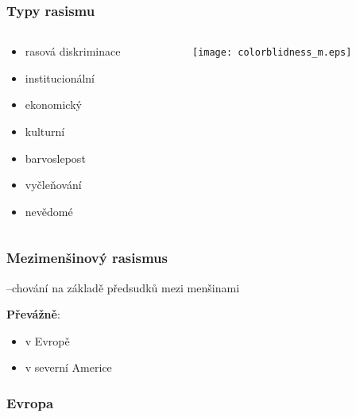 \documentclass{beamer}
\begin{document}
\begin{frame}
\transwipe
{}
\frametitle{Typy rasismu}
\begin{columns}[onlytextwidth]
\begin{column}{0.4\textwidth}
\begin{itemize}
\item rasová diskriminace
\item institucionální
\item ekonomický
\item kulturní
\item barvoslepost
\item vyčleňování
\item nevědomé
\end{itemize}
\end{column}
\begin{column}{0.6\textwidth}
\begin{figure}
\texttt{[image: colorblidness\_m.eps]}
\end{figure}
\end{column}
\end{columns}
\end{frame}

\begin{frame}
\transwipe
{}
\frametitle{Mezimenšinový rasismus}

\quad --\quad chování na základě předsudků mezi menšinami
\newline

\textbf{Převážně}:

\begin{itemize}
\item v Evropě
\item v severní Americe
\end{itemize}
\end{frame}

\begin{frame}
\transwipe
{}
\frametitle{Evropa}
\end{frame}
\end{document}
